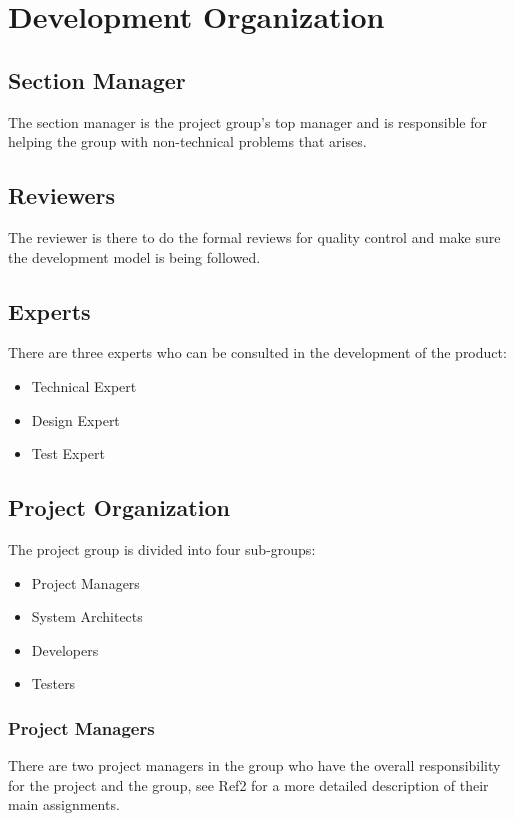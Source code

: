 \documentclass[a4paper]{article}
\begin{document}
\section{Development Organization}

\subsection{Section Manager}
The section manager is the project group's top manager and is responsible for helping the group with non-technical problems that arises.

\subsection{Reviewers}
The reviewer is there to do the formal reviews for quality control and make sure the development model is being followed.

\subsection{Experts}
There are three experts who can be consulted in the development of the product:
\begin{itemize}
\item Technical Expert
\item Design Expert
\item Test Expert
\end{itemize}

\subsection{Project Organization}

The project group is divided into four sub-groups:
\begin{itemize}
\item Project Managers
\item System Architects
\item Developers
\item Testers
\end{itemize}

\subsubsection{Project Managers}
There are two project managers in the group who have the overall responsibility for the project and the group, see Ref2 for a more detailed description of their main assignments.
\end{document}
